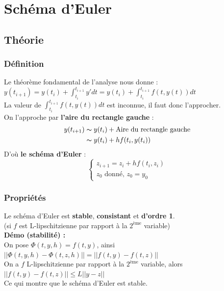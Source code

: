 \documentclass[a4paper,10pt]{report}
\begin{document}
\newpage
\section{Schéma d'Euler}
\subsection{Théorie}
\subsubsection{Définition}
\noindent Le théorème fondamental de l'analyse nous donne : $y(t_{i+1}) = y(t_i) + \int_{t_i}^{t_{i+1}} y'dt = y(t_i) + \int_{t_i}^{t_{i+1}} f(t,y(t))dt$\\
La valeur de $\int_{t_i}^{t_{i+1}} f(t,y(t))dt$ est inconnue, il faut donc l'approcher.\\
On l'approche par \textbf{l'aire du rectangle gauche} :
\abovedisplayskip=0mm
\begin{align*}
   y(t_{i+1}) & \thicksim y(t_i)+ \text{Aire du rectangle gauche} \\
			  & \thicksim y(t_i)+ hf(t_i,y(t_i))
\end{align*}
D'où \textbf{le schéma d'Euler} :
\begin{equation}
\left\lbrace
\begin{array}{l}
z_{i+1}=z_i+hf(t_i,z_i) \\
z_0 \text{ donné, } z_0=y_0
\end{array}\right.
\end{equation}

\subsubsection{Propriétés}
\noindent Le schéma d'Euler est \textbf{stable}, \textbf{consistant} et \textbf{d'ordre 1}. \\
(si $f$ est L-lipschitzienne par rapport à la $2^{\text{ème}}$ variable)  \\

\textbf{Démo (stabilité) :}\\
\indent On pose $\Phi(t,y,h)=f(t,y)$, ainsi $||\Phi(t,y,h)-\Phi(t,z,h)|| = ||f(t,y)-f(t,z)||$\\
\indent On a $f$ L-lipschitzienne par rapport à la $2^{\text{ème}}$ variable, alors $||f(t,y)-f(t,z)||\leq L||y-z||$\\
\indent Ce qui montre que le schéma d'Euler est stable. \\
\end{document}
